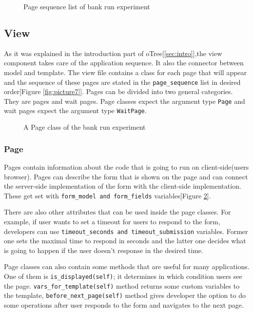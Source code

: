 \begin{figure}[h]
	\centerline{}
	\caption{Page sequence list of bank run experiment}
	\label{fig:picture9}
\end{figure}

\subsection{View}

As it was explained in the introduction part of oTree[\ref{sec:intro}],the view component takes care of the application sequence. It also the connector between model and template. The view file contains a class for each page that  will appear and the sequence of these pages are stated in the \verb|page_sequence| list in desired order[Figure \ref{fig:picture7}]. Pages can be divided into two general categories. They are pages and wait pages. Page classes expect the argument type \verb|Page| and wait pages expect the argument type \verb|WaitPage|.

\begin{figure}[h]
	\centerline{}
	\caption{A Page class of the bank run experiment}
	\label{fig:picture10}
\end{figure}

\subsubsection{Page}\label{sub:page}

Pages contain information about the code that is going to run on client-side(users browser). Pages can describe the form that is shown on the page and can connect the server-side implementation of the form with the client-side implementation. These get set with \verb|form_model and form_fields| variables[Figure \ref{fig:picture10}].

There are also other attributes that can be used inside the page classes. For example, if user wants to set a timeout for users to respond to the form, developers can use \verb|timeout_seconds and timeout_submission| variables. Former one sets the maximal time to respond in seconds and the latter one decides what is going to happen if the user doesn't response in the desired time.

Page classes can also contain some methods that are useful for many applications. One of them is \verb|is_displayed(self)|; it determines in which condition users see the page. \verb|vars_for_template(self)| method returns some custom variables to the template, \verb|before_next_page(self)| method gives developer the option to do some operations after user responds to the form and navigates to the next page.

